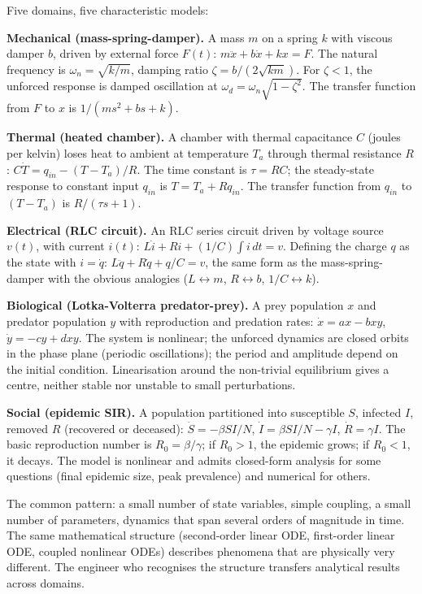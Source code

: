 Five domains, five characteristic models:

\textbf{Mechanical (mass-spring-damper).} A mass $m$ on a spring $k$ with viscous damper $b$, driven by external force $F(t)$: $m\ddot{x} + b\dot{x} + kx = F$. The natural frequency is $\omega_n = \sqrt{k/m}$, damping ratio $\zeta = b/(2\sqrt{km})$. For $\zeta < 1$, the unforced response is damped oscillation at $\omega_d = \omega_n \sqrt{1-\zeta^2}$. The transfer function from $F$ to $x$ is $1/(ms^2 + bs + k)$.

\textbf{Thermal (heated chamber).} A chamber with thermal capacitance $C$ (joules per kelvin) loses heat to ambient at temperature $T_a$ through thermal resistance $R$: $C \dot{T} = q_{in} - (T - T_a)/R$. The time constant is $\tau = RC$; the steady-state response to constant input $q_{in}$ is $T = T_a + R q_{in}$. The transfer function from $q_{in}$ to $(T - T_a)$ is $R/(\tau s + 1)$.

\textbf{Electrical (RLC circuit).} An RLC series circuit driven by voltage source $v(t)$, with current $i(t)$: $L \dot{i} + Ri + (1/C)\int i\,dt = v$. Defining the charge $q$ as the state with $i = \dot{q}$: $L \ddot{q} + R\dot{q} + q/C = v$, the same form as the mass-spring-damper with the obvious analogies ($L \leftrightarrow m$, $R \leftrightarrow b$, $1/C \leftrightarrow k$).

\textbf{Biological (Lotka-Volterra predator-prey).} A prey population $x$ and predator population $y$ with reproduction and predation rates: $\dot{x} = a x - b x y$, $\dot{y} = -c y + d x y$. The system is nonlinear; the unforced dynamics are closed orbits in the phase plane (periodic oscillations); the period and amplitude depend on the initial condition. Linearisation around the non-trivial equilibrium gives a centre, neither stable nor unstable to small perturbations.

\textbf{Social (epidemic SIR).} A population partitioned into susceptible $S$, infected $I$, removed $R$ (recovered or deceased): $\dot{S} = -\beta SI/N$, $\dot{I} = \beta SI/N - \gamma I$, $\dot{R} = \gamma I$. The basic reproduction number is $R_0 = \beta/\gamma$; if $R_0 > 1$, the epidemic grows; if $R_0 < 1$, it decays. The model is nonlinear and admits closed-form analysis for some questions (final epidemic size, peak prevalence) and numerical for others.

The common pattern: a small number of state variables, simple coupling, a small number of parameters, dynamics that span several orders of magnitude in time. The same mathematical structure (second-order linear ODE, first-order linear ODE, coupled nonlinear ODEs) describes phenomena that are physically very different. The engineer who recognises the structure transfers analytical results across domains.


